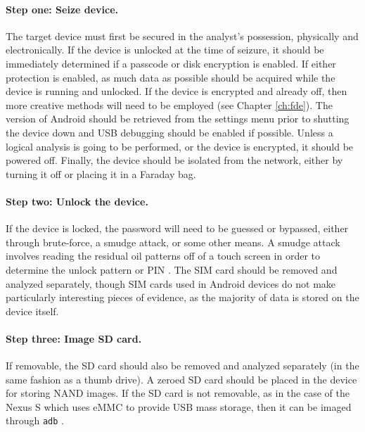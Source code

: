 \paragraph{Step one: Seize device.}
The target device must first be secured in the analyst's possession, physically and electronically.  If the device is unlocked at
the time of seizure, it should be immediately determined if a passcode or disk encryption is enabled. If either protection is
enabled, as much data as possible should be acquired while the device is running and unlocked.  If the device is encrypted and
already off, then more creative methods will need to be employed (see Chapter \ref{ch:fde}).  The version of Android should be
retrieved from the settings menu prior to shutting the device down and USB debugging should be enabled if possible.  Unless a
logical analysis is going to be performed, or the device is encrypted, it should be powered off.  Finally, the device should be
isolated from the network, either by turning it off or placing it in a Faraday bag.

\paragraph{Step two: Unlock the device.}
If the device is locked, the password will need to be guessed or bypassed, either through brute-force, a smudge attack, or some
other means.  A smudge attack involves reading the residual oil patterns off of a touch screen in order to determine the unlock
pattern or PIN \cite{smudge}. The SIM card should be removed and analyzed separately, though SIM cards used in Android devices do
not make particularly interesting pieces of evidence, as the majority of data is stored on the device itself.

\paragraph{Step three: Image SD card.}
 If removable, the SD card should also be removed and analyzed separately (in the same fashion as a thumb drive). A zeroed SD card
should be placed in the device for storing NAND images. If the SD card is not removable, as in the case of the Nexus S which uses
eMMC to provide USB mass storage, then it can be imaged through \texttt{adb} \cite[pp. 211-218]{hoog}.
 
